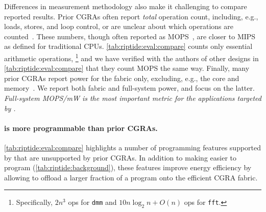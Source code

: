 Differences in measurement methodology also make it challenging to compare reported results.
% 
Prior CGRAs often report \emph{total} operation count, including, e.g., loads, stores, and loop control, or are unclear about which operations are counted~\cite{srp,ipa,cma}.
% 
These numbers, though often reported as MOPS~\cite{srp,ipa}, are closer to MIPS as defined for traditional CPUs.
% 
%
\autoref{tab:riptide:eval:compare} counts only essential arithmetic operations,%
\footnote{Specifically, $2n^3$ ops for {\tt dmm} and $10 n \log_2 n + O(n)$ ops for {\tt fft}.}
and we have verified with the authors
of other designs in \autoref{tab:riptide:eval:compare} that they count MOPS the same way.
%
Finally, many prior CGRAs report power for the fabric only,
excluding, e.g., the core and memory~\cite{revamp,cma,kim2009hierarchical}.
%
We report both fabric and full-system power, and focus on the latter.
%
\emph{Full-system MOPS/mW is the most important metric for
the applications targeted by \riptide.}


\paragraph{\riptide is more programmable than prior CGRAs.}
%
\autoref{tab:riptide:eval:compare} highlights a number of programming
features supported by \riptide that are unsupported by prior CGRAs.
%
In addition to making \riptide easier to program (\autoref{tab:riptide:background}),
these features improve energy efficiency by allowing \riptide to offload a larger fraction
of a program onto the efficient CGRA fabric.

